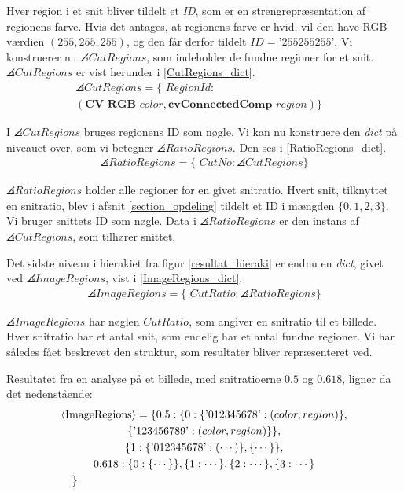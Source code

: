 {Hver region i et snit bliver tildelt et \emph{ID}, som er en
strengrepræsentation af regionens farve.  Hvis det antages, at regionens
farve er hvid, vil den have RGB-værdien $(255, 255, 255)$, og den får
derfor tildelt $ID = \textrm{'255255255'}$. Vi konstruerer nu
$\angles{CutRegions}$, som indeholder de fundne regioner for et snit.
$\angles{CutRegions}$ er vist herunder i \eqref{CutRegions_dict}.
\begin{multline}
    \angles{CutRegions} = \{ \textit{~RegionId} : \\
    (\textbf{CV\_RGB~}\textit{color}, \textbf{cvConnectedComp~}\textit{region}) \}\quad
    \label{CutRegions_dict}
\end{multline}

\noindent I $\angles{CutRegions}$ bruges regionens ID som nøgle. Vi kan nu
konstruere den \emph{dict} på niveauet over, som vi betegner
$\angles{RatioRegions}$. Den ses i \eqref{RatioRegions_dict}.
\begin{eqnarray}
    \angles{RatioRegions} = \{ \textit{~CutNo} : \angles{CutRegions} \}
    \label{RatioRegions_dict}
\end{eqnarray}

\noindent $\angles{RatioRegions}$ holder alle regioner for en givet
snitratio.  Hvert snit, tilknyttet en snitratio, blev i afsnit
\ref{section_opdeling} tildelt et ID i mængden $\{0,1,2,3\}$. Vi bruger
snittets ID som nøgle.  Data i $\angles{RatioRegions}$ er den instans af
$\angles{CutRegions}$, som tilhører snittet.

Det sidste niveau i hierakiet fra figur \ref{resultat_hieraki} er endnu
en \emph{dict}, givet ved $\angles{ImageRegions}$, vist i
\eqref{ImageRegions_dict}.
\begin{eqnarray}
    \angles{ImageRegions} = \{ \textit{~CutRatio} : \angles{RatioRegions} \}
    \label{ImageRegions_dict}
\end{eqnarray}

\noindent $\angles{ImageRegions}$ har nøglen $CutRatio$, som angiver en
snitratio til et billede. Hver snitratio har et antal snit, som endelig
har et antal fundne regioner. Vi har således fået beskrevet den
struktur, som resultater bliver repræsenteret ved.

Resultatet fra en analyse på et billede, med snitratioerne $0.5$ og
$0.618$, ligner da det nedenstående:
\begin{multline}
    \angles{ImageRegions} = \{ 0.5 : \{ 0 : \{ \textrm{'012345678'} : (color, region) \},\\
                                            \{ \textrm{'123456789'} : (color, region) \}
                                            \},\\
                                            \{ 1 : \{ \textrm{'012345678'} : ( \cdots ) \}, 
                                            \{ \cdots \} \}, \\
                              0.618 : \{ 0 : \{ \cdots \} \}, \{ 1 :
                              \cdots \}, \{ 2 : \cdots \}, \{ 3 : \cdots
                              \} \\
    \shoveleft{\}}\shoveright{}
    \label{CutRegions_dict}
\end{multline}

}
